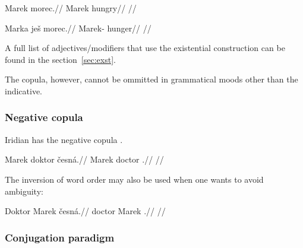 \pex
\begingl
\gla *Marek morec.//
\glb Marek hungry//
\glft {}//
\endgl
\xe


\pex
\begingl
\gla Marka ješ morec.//
\glb Marek-\Acc{} \Exst{} hunger//
\glft {}//
\endgl
\xe

A full list of adjectives/modifiers that use the existential construction can be
found in the section~\ref{sec:exst}.

The copula, however, cannot be ommitted in grammatical moods other than the
indicative.

\subsubsection{Negative copula}

Iridian has the negative copula .

\pex
\begingl
\gla Marek doktor česná.//
\glb Marek doctor \Cop{}.\Neg{}//
\glft {}//
\endgl
\xe

The inversion of word order may also be used when one wants to avoid ambiguity:

\pex
\begingl
\gla Doktor Marek česná.//
\glb doctor Marek \Cop{}.\Neg{}//
\glft {}//
\endgl
\xe


\subsubsection{Conjugation paradigm}
